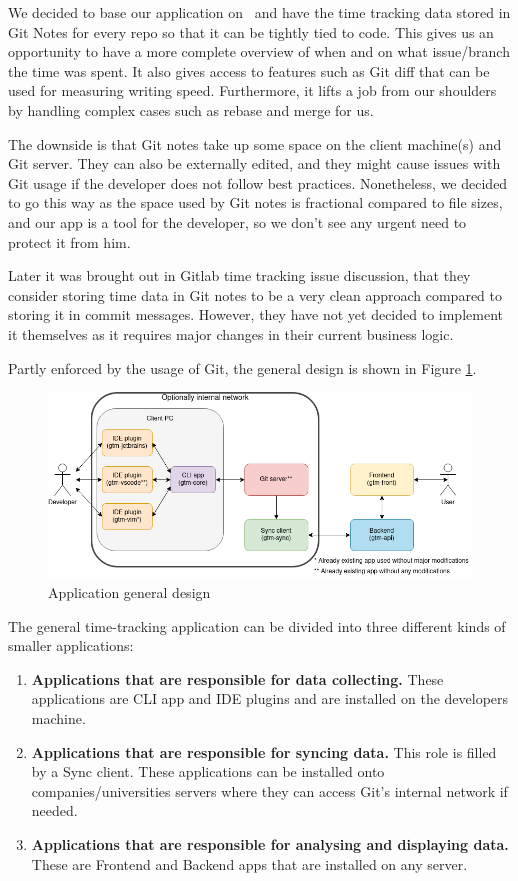 We decided to base our application on~ and have the time tracking data stored in Git Notes
for every repo so that it can be tightly tied to code.
This gives us an opportunity to have a more complete overview of when and on what issue/branch the time was spent.
It also gives access to features such as Git diff that can be used for measuring writing speed.
Furthermore, it lifts a job from our shoulders by handling complex cases such as rebase and merge for us.

The downside is that Git notes take up some space on the client machine(s) and Git server.
They can also be externally edited, and they might cause issues with Git usage if the developer does not follow best practices.
Nonetheless, we decided to go this way as the space used by Git notes is fractional compared to file sizes, and our app is a tool for the developer,
so we don't see any urgent need to protect it from him.

Later it was brought out in Gitlab time tracking issue discussion, that they consider storing time data in Git notes
to be a very clean approach compared to storing it in commit messages.
However, they have not yet decided to implement it themselves as it requires major changes in their current business logic.
\cite{gitlab-time-issue}

Partly enforced by the usage of Git, the general design is shown in Figure
\ref{fig:project-archidecture}.

\begin{figure}[h]
    \includegraphics[width=\textwidth]{figures/project_archidecture}
    \caption{Application general design}
    \label{fig:project-archidecture}
\end{figure}

The general time-tracking application can be divided into three different kinds of smaller applications:
\begin{enumerate}
    \item \textbf{Applications that are responsible for data collecting.} These applications are CLI app and IDE plugins and are installed on the developers machine.
    \item \textbf{Applications that are responsible for syncing data.} This role is filled by a Sync client.
    These applications can be installed onto companies/universities servers where they can access Git's internal network if needed.
    \item \textbf{Applications that are responsible for analysing and displaying data.} These are Frontend and Backend apps that are installed on any server.
\end{enumerate}

